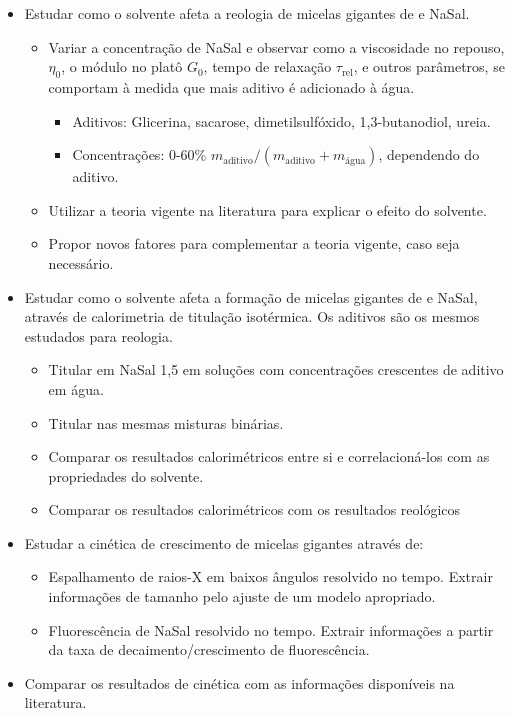 		\begin{itemize}[noitemsep]
			\item Estudar como o solvente afeta a reologia de micelas gigantes de \CTAB{} e NaSal.
			\begin{itemize}[noitemsep]
				\item Variar a concentração de NaSal e observar como a viscosidade no repouso, \(\eta_0\), o módulo no platô \(G_0\), tempo de relaxação \(\tau_{\mathrm{rel}}\), e outros parâmetros, se comportam à medida que mais aditivo é adicionado à água.
				\begin{itemize}[noitemsep]
					\item Aditivos: Glicerina, sacarose, dimetilsulfóxido, 1,3-butanodiol, ureia.
					\item Concentrações: 0-60\% \(m_{\mathrm{aditivo}}/\left(m_{\mathrm{aditivo}}+m_{\mathrm{água}}\right)\), dependendo do aditivo.
				\end{itemize}
				\item Utilizar a teoria vigente na literatura para explicar o efeito do solvente.
				\item Propor novos fatores para complementar a teoria vigente, caso seja necessário.
			\end{itemize}
			\item Estudar como o solvente afeta a formação de micelas gigantes de \TTAB{} e NaSal, através de calorimetria de titulação isotérmica. Os aditivos são os mesmos estudados para reologia.
			\begin{itemize}[noitemsep]
				\item Titular \TTAB{} em NaSal 1,5\mM{} em soluções com concentrações crescentes de aditivo em água.
				\item Titular \TTAB{} nas mesmas misturas binárias.
				\item Comparar os resultados calorimétricos entre si e correlacioná-los com as propriedades do solvente.
				\item Comparar os resultados calorimétricos com os resultados reológicos
			\end{itemize}
			\item Estudar a cinética de crescimento de micelas gigantes através de:
			\begin{itemize}[noitemsep]
				\item Espalhamento de raios-X em baixos ângulos resolvido no tempo. Extrair informações de tamanho pelo ajuste de um modelo apropriado.
				\item Fluorescência de NaSal resolvido no tempo. Extrair informações a partir da taxa de decaimento/crescimento de fluorescência.
			\end{itemize}
			\item Comparar os resultados de cinética com as informações disponíveis na literatura.
		\end{itemize}
		